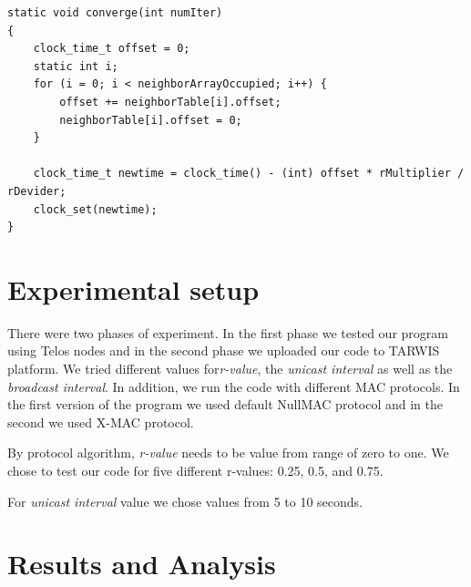 \documentclass{llncs}
\begin{document}
\begin{lstlisting}
static void converge(int numIter)
{
	clock_time_t offset = 0;
	static int i;
	for (i = 0; i < neighborArrayOccupied; i++) {
		offset += neighborTable[i].offset;
		neighborTable[i].offset = 0;
	}

	clock_time_t newtime = clock_time() - (int) offset * rMultiplier / rDevider;
	clock_set(newtime);
}

\end{lstlisting}

\section{Experimental setup}
There were two phases of experiment. In the first phase we tested our program using Telos nodes and in the second phase we uploaded our code to TARWIS platform. We tried different values for\textit{r-value}, the \textit{unicast interval} as well as the \textit{broadcast interval}. In addition, we run the code with different MAC protocols. In the first version of the program we used default NullMAC protocol and in the second we used X-MAC protocol. 

By protocol algorithm, \textit{r-value} needs to be value from range of zero to one. We chose to test our code for five different r-values: 0.25, 0.5, and 0.75. 

For \textit{unicast interval} value we chose values from 5 to 10 seconds.

\section{Results and Analysis}
\end{document}
